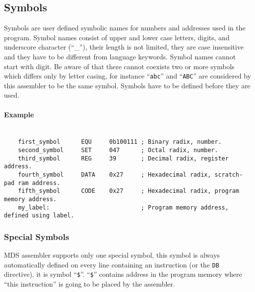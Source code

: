     \subsection{Symbols}
        Symbols are user defined symbolic names for numbers and addresses used in the program. Symbol names consist of upper and lower case letters, digits, and underscore character (``\_''), their length is not limited, they are case insensitive and they have to be different from language keywords. Symbol names cannot start with digit. Be aware of that there cannot coexists two or more symbols which differs only by letter casing, for instance ``\texttt{abc}'' and ``\texttt{ABC}'' are considered by this assembler to be the same symbol. Symbols have to be defined before they are used.

        \paragraph{Example}
        ~\\
        \verb'    first_symbol      EQU     0b100111 ; Binary radix, number.'\\
        \verb'    second_symbol     SET     047      ; Octal radix, number.'\\
        \verb'    third_symbol      REG     39       ; Decimal radix, register address.'\\
        \verb'    fourth_symbol     DATA    0x27     ; Hexadecimal radix, scratch-pad ram address.'\\
        \verb'    fifth_symbol      CODE    0x27     ; Hexadecimal radix, program memory address.'\\
        \verb'    my_label:                          ; Program memory address, defined using label.'

        \subsubsection{Special Symbols}
            MDS assembler supports only one special symbol, this symbol is always automatically defined on every line containing an instruction (or the \texttt{DB} directive), it is symbol ``\texttt{\$}''. ``\texttt{\$}'' contains address in the program memory where ``this instruction'' is going to be placed by the assembler.

